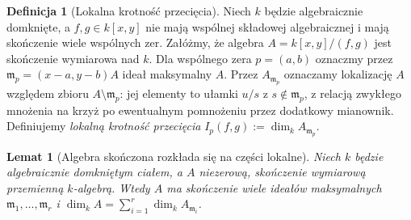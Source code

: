 \documentclass[11pt,a4paper,openany]{report}
\numberwithin{equation}{section}
\theoremstyle{plain}
\newtheorem{lemat}[twierdzenie]{Lemat}
\theoremstyle{definition}
\newtheorem{definicja}[twierdzenie]{Definicja}
\theoremstyle{remark}
\begin{document}
\begin{definicja}[Lokalna krotność przecięcia]
\label{def:intersection-multiplicity}
Niech $k$ będzie algebraicznie domknięte,
a $f,g\in k[x,y]$ nie mają wspólnej składowej algebraicznej
i mają skończenie wiele wspólnych zer.
Załóżmy, że algebra $A=k[x,y]/(f,g)$ jest skończenie wymiarowa
nad $k$. Dla wspólnego zera $p=(a,b)$ oznaczmy przez
$\mathfrak m_p=(x-a,y-b)A$ ideał maksymalny $A$.
Przez $A_{\mathfrak m_p}$ oznaczamy lokalizację $A$
względem zbioru $A\setminus\mathfrak m_p$:
jej elementy to ułamki $u/s$ z $s\notin\mathfrak m_p$,
z relacją zwykłego mnożenia na krzyż po ewentualnym
pomnożeniu przez dodatkowy mianownik.
Definiujemy \emph{lokalną krotność przecięcia}
$I_p(f,g):=\dim_k A_{\mathfrak m_p}$.
\end{definicja}

\begin{lemat}[Algebra skończona rozkłada się na części lokalne]
\label{lem:artin-decomposition}
Niech $k$ będzie algebraicznie domkniętym ciałem,
a $A$ niezerową, skończenie wymiarową przemienną $k$-algebrą.
Wtedy $A$ ma skończenie wiele ideałów maksymalnych
$\mathfrak m_1,\ldots,\mathfrak m_r$ i
$\dim_kA=\sum_{i=1}^r\dim_k A_{\mathfrak m_i}$.
\end{lemat}
\end{document}
